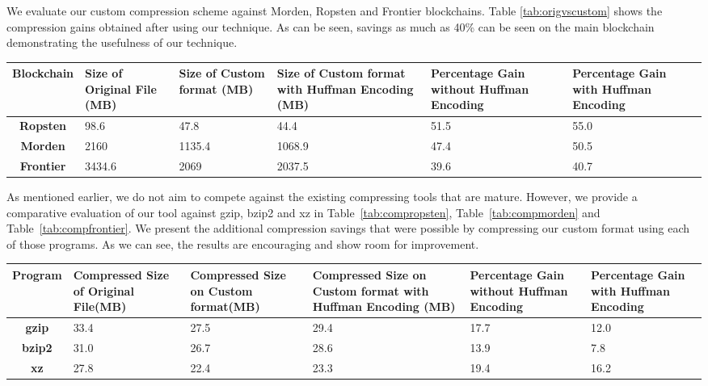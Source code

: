 
We evaluate our custom compression scheme against Morden, Ropsten and Frontier blockchains.
Table \ref{tab:origvscustom} shows the compression gains obtained after using our technique.
As can be seen, savings as much as 40\% can be seen on the main blockchain demonstrating the usefulness
of our technique.
\begin{table*}
	\centering
\captionsetup{justification=centering}
\begin{tabular}{ >{\bfseries}c| p{2cm} | p{2cm} | p{2cm} |p{1.5cm} |p{1.5cm} }
	Blockchain& {Size of Original File (MB)} & {\par{Size of Custom format \newline (MB)}} & {Size of Custom format with Huffman Encoding (MB)} & \par{Percentage Gain without Huffman Encoding}  & \par{Percentage Gain with Huffman Encoding} \\
  \hline
  Ropsten & 98.6 & 47.8  & 44.4 &51.5  & 55.0\\
  Morden & 2160 & 1135.4 &1068.9 & 47.4 & 50.5 \\
  Frontier  & 3434.6  & 2069 & 2037.5 & 39.6 & 40.7\\
\end{tabular}
\caption{Compression gains using our custom format with and without Huffman encoding} 
\label{tab:origvscustom}
\end{table*}

As mentioned earlier, we do not aim to compete against the existing compressing tools that are mature.
However, we provide a comparative evaluation of our tool against gzip, bzip2 and xz in
Table~\ref{tab:compropsten}, Table~\ref{tab:compmorden} and Table~\ref{tab:compfrontier}. 
We present the additional compression savings that were possible by compressing 
our custom format using each of those programs.
As we can see, the results are encouraging and show room for improvement.

\begin{table*}
	\centering
\captionsetup{justification=centering}
\begin{tabular}{ >{\bfseries}c| p{2cm} | p{2cm} |p{2cm} | p{1.5cm} | p{1.5cm} }
	Program & {Compressed Size of Original File(MB)} & {Compressed Size on Custom format(MB)} & {Compressed Size on Custom format with Huffman Encoding (MB)}& Percentage Gain without Huffman Encoding & Percentage Gain with Huffman Encoding\\
  \hline
  gzip  & 33.4 & 27.5 & 29.4 & 17.7 & 12.0 \\
  bzip2 & 31.0 & 26.7 & 28.6 & 13.9 & 7.8  \\
  xz   & 27.8 & 22.4 &  23.3 & 19.4 & 16.2 \\
\end{tabular}
\caption{Compression of Ropsten testnet. \\ Original Size = 98.6MB. Custom format size = 47.8MB}
\label{tab:compropsten}
\end{table*}


